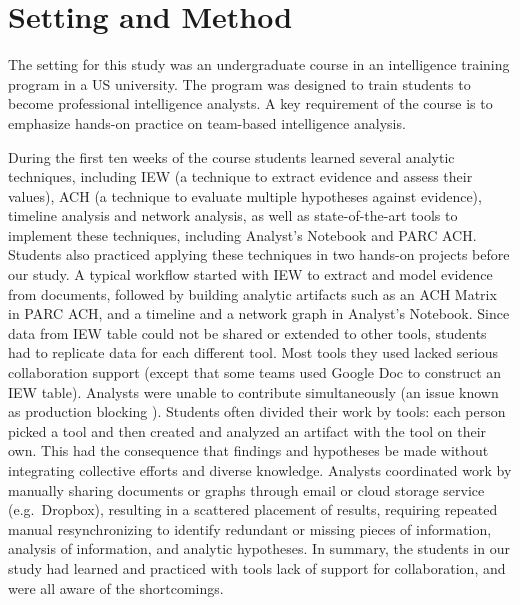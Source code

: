 \section{Setting and Method}\label{classroom-study-settings}


The setting for this study was an undergraduate course in an intelligence
training program in a US university. The program was designed to train students
to become professional intelligence analysts. A key requirement of the course is
to emphasize hands-on practice on team-based intelligence analysis. 


During the first ten weeks of the course
students learned several analytic techniques, including IEW (a technique
to extract evidence and assess their values), ACH (a technique to evaluate
multiple hypotheses against evidence), timeline analysis and network
analysis, as well as state-of-the-art tools to implement these
techniques, including Analyst's Notebook and PARC ACH. Students also practiced applying these
techniques in two hands-on projects before our study. A typical workflow started with IEW to
extract and model evidence from documents, followed by building analytic
artifacts such as an ACH Matrix in PARC ACH, and a timeline and a network
graph in Analyst's Notebook. Since data from IEW table could not be
shared or extended to other tools, students had to replicate data for
each different tool. Most tools they used lacked serious collaboration
support (except that some teams used Google Doc to construct an IEW
table). Analysts were unable to contribute simultaneously (an issue
known as production blocking \cite{Diehl1987a}). Students often divided their work by tools: each person picked a tool and then created and analyzed an artifact
with the tool on their own. This had the consequence that findings and
hypotheses be made without integrating collective efforts and diverse
knowledge. Analysts coordinated work by manually sharing documents
or graphs through email or cloud storage service (e.g.~Dropbox),
resulting in a scattered placement of results, requiring repeated manual
resynchronizing to identify redundant or missing pieces of information,
analysis of information, and analytic hypotheses. In summary, the students in our study had learned and practiced with tools lack of support for collaboration, and were all aware of the shortcomings.

